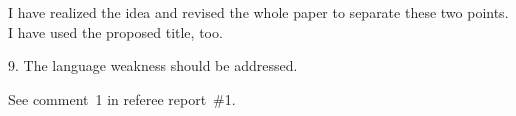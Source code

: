 \documentclass{article}
\begin{document}
I have realized the idea and revised the whole paper to separate these two points.
I have used the proposed title, too.

\begin{leftbar}
\end{leftbar}

\begin{quoting}
9. The language weakness should be addressed.
\end{quoting}

See comment~1 in referee report~\#1.




\end{document}
